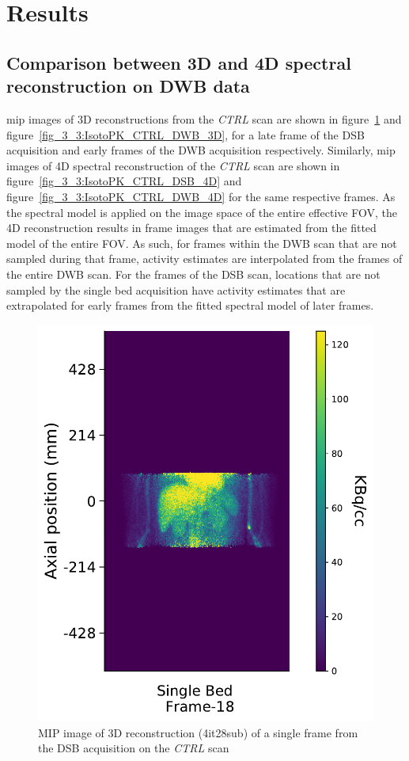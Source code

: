 \section{Results}
\subsection{Comparison between 3D and 4D spectral reconstruction on DWB data}
\Gls{mip} images of 3D reconstructions from the \textit{CTRL} scan are shown in figure~\ref{fig_3_3:IsotoPK_CTRL_DSB_3D} and figure~\ref{fig_3_3:IsotoPK_CTRL_DWB_3D}, for a late frame of the DSB acquisition and early frames of the DWB acquisition respectively. 
Similarly, \gls{mip} images of 4D spectral reconstruction of the \textit{CTRL} scan are shown in figure~\ref{fig_3_3:IsotoPK_CTRL_DSB_4D} and figure~\ref{fig_3_3:IsotoPK_CTRL_DWB_4D} for the same respective frames. 
As the spectral model is applied on the image space of the entire effective FOV, the 4D reconstruction results in frame images that are estimated from the fitted model of the entire FOV. As such, for frames within the DWB scan that are not sampled during that frame, activity estimates are interpolated from the frames of the entire DWB scan. For the frames of the DSB scan, locations that are not sampled by the single bed acquisition have activity estimates that are extrapolated for early frames from the fitted spectral model of later frames.

\begin{figure} [h!]
\centering
\includegraphics[scale=0.52,angle=0]{3_Results/3_3_DWB_Reconstruction/figures/3_3_IsotoPK_CTRL_DSB_3D.pdf}
\caption{MIP image of 3D reconstruction (4it28sub) of a single frame from the DSB acquisition on the \textit{CTRL} scan}
\label{fig_3_3:IsotoPK_CTRL_DSB_3D}
\end{figure} 

